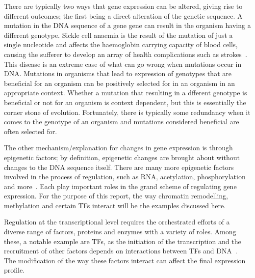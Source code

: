         There are typically two ways that gene expression can be altered, giving rise to different outcomes; the first being a direct alteration of the genetic sequence. A mutation in the DNA sequence of a gene gene can result in the organism having a different genotype.        %
        Sickle cell anaemia is the result of the mutation of just a single nucleotide and affects the haemoglobin carrying capacity of blood cells, causing the sufferer to develop an array of health complications such as strokes~\cite{clancy2008dna}. This disease is an extreme case of what can go wrong when mutations occur in DNA. Mutations in organisms that lead to expression of genotypes that are beneficial for an organism can be positively selected for in an organism in an appropriate context. Whether a mutation that resulting in a dfferent genotype is beneficial or not for an organism is context dependent, but this is essentially the corner stone of evolution. Fortunately, there is typically some redundancy when it comes to the genotype of an organism and mutations considered beneficial are often selected for.
        
        The other mechanism/explanation for changes in gene expression is through epigenetic factors; by definition, epigenetic changes are brought about without changes to the DNA sequence itself. There are many more epigenetic factors involved in the process of regulation, such as RNA, acetylation, phosphorylation and more~\cite{geiman2002chromatin, jaenisch2003epigenetic,holoch2015rna, waterland2003transposable}. Each play important roles in the grand scheme of regulating gene expression. For the purpose of this report, the way chromatin remodelling, methylation and certain TFs interact will be the examples discussed here.


        Regulation at the transcriptional level requires the orchestrated efforts of a diverse range of factors, proteins and enzymes with a variety of roles. Among these, a notable example are TFs, as the initiation of the transcription and the recruitment of other factors depends on interactions between TFs and DNA~\cite{lemon2000orchestrated}. The modification of the way these factors interact can affect the final expression profile. 
        
